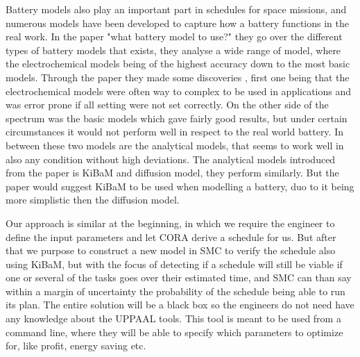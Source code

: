 Battery models also play an important part in schedules for space missions, and numerous models have been developed to capture how a battery functions in the real work. In the paper "what battery model to use?" they go over the different types of battery models that exists, they analyse a wide range of model, where the electrochemical models being of the highest accuracy down to the most basic models. Through the paper they made some discoveries , first one being that the electrochemical models were often way to complex to be used in applications and was error prone if all setting were not set correctly. On the other side of the spectrum was the basic models which gave fairly good results, but under certain circumstances it would not perform well in respect to the real world battery. In between these two models are the analytical models, that seems to work well in also any condition without high deviations. The analytical models introduced from the paper is KiBaM and diffusion model, they perform similarly. But the paper would suggest KiBaM to be used when modelling a battery, duo to it being more simplistic then the diffusion model.

Our approach is similar at the beginning, in which we require the engineer to define the input parameters and let CORA derive a schedule for us. But after that we purpose to construct a new model in SMC to verify the schedule also using KiBaM, but with the focus of detecting if a schedule will still be viable if one or several of the tasks goes over their estimated time, and SMC can than say within a margin of uncertainty the probability of the schedule being able to run its plan. The entire solution will be a black box so the engineers do not need have any knowledge about the UPPAAL tools. This tool is meant to be used from a command line, where they will be able to specify which parameters to optimize for, like profit, energy saving etc.




